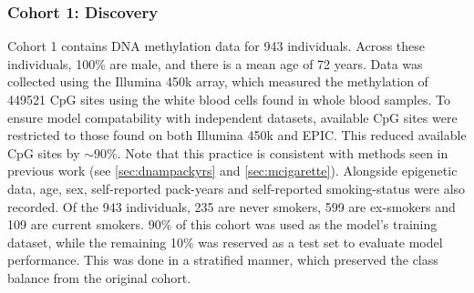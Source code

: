 \documentclass{article}
\begin{document}
\subsubsection{Cohort 1: Discovery}
Cohort 1 contains DNA methylation data for 943 individuals. Across these individuals, 100\% are male, and there is a mean age of 72 years. Data was collected using the Illumina 450k array, which measured the methylation of \num{449521} CpG sites using the white blood cells found in whole blood samples. To ensure model compatability with independent datasets, available CpG sites were restricted to those found on both Illumina 450k and EPIC. This reduced available CpG sites by \(\sim\!90\%\). Note that this practice is consistent with methods seen in previous work (see \ref{sec:dnampackyrs} and \ref{sec:mcigarette}). Alongside epigenetic data, age, sex, self-reported pack-years and self-reported smoking-status were also recorded. Of the 943 individuals, 235 are never smokers, 599 are ex-smokers and 109 are current smokers. 90\% of this cohort was used as the model's training dataset, while the remaining 10\% was reserved as a test set to evaluate model performance. This was done in a stratified manner, which preserved the class balance from the original cohort.

\end{document}

